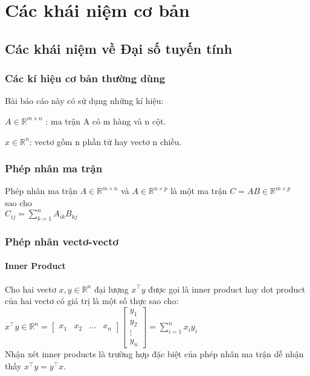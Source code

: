 \chapter{Các khái niệm cơ bản}
\section{Các khái niệm về Đại số tuyến tính}
\subsection{Các kí hiệu cơ bản thường dùng}
Bài báo cáo này có sử dụng những kí hiệu:

$A \in \mathbb{R}^{m\times n}$	: ma trận A có m hàng và n cột.

$x \in \mathbb{R}^n$: vectơ gồm n phần tử hay vectơ n chiều.

\subsection{Phép nhân ma trận}
Phép nhân ma trận $A \in \mathbb{R}^{m\times n}$ và $A \in \mathbb{R} ^{n\times p}$ là một ma trận 
$C=AB \in \mathbb{R} ^{m\times p}$ \\sao cho \\
$C_{ij} = \sum_{k=1}^{n}A_{ik}B_{kj}$

\subsection{Phép nhân vectơ-vectơ}
\subsubsection{Inner Product}
Cho hai vectơ $x,y\in \mathbb{R}^n$ đại lượng $x^\top y$ được gọi là inner product hay dot product của hai vectơ có giá trị là một số thực sao cho:\\

$x^\top y \in \mathbb{R} ^{n} =
\left[\begin{matrix}x_1 & x_2 & \dots & x_n\end{matrix}\right]
\left[\begin{matrix}
y_1 \\
y_2 \\
\vdots\\
y_n
\end{matrix}\right]
=  \sum_{i=1}^{n}x_{i}y_{i}$\\
Nhận xét inner products là trường hợp đặc biệt của phép nhân ma trận dễ nhận thấy $x^\top y = y^\top x$.


